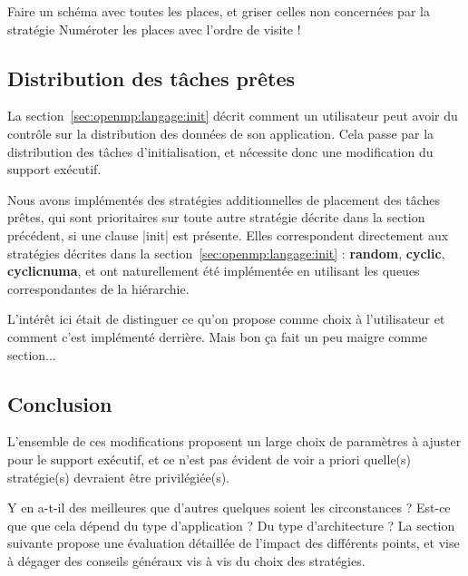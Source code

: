 \begin{todo}
  Faire un schéma avec toutes les places, et griser celles non concernées par la stratégie
  Numéroter les places avec l'ordre de visite !
\end{todo}


\subsection{Distribution des tâches prêtes}


La section~\ref{sec:openmp:langage:init} décrit comment un utilisateur peut avoir du contrôle sur la distribution des données de son application.
Cela passe par la distribution des tâches d'initialisation, et nécessite donc une modification du support exécutif.

Nous avons implémentés des stratégies additionnelles de placement des tâches prêtes, qui sont prioritaires sur toute autre stratégie décrite dans la section précédent, si une clause |init| est présente.
Elles correspondent directement aux stratégies décrites dans la section~\ref{sec:openmp:langage:init} : \textbf{random}, \textbf{cyclic}, \textbf{cyclicnuma}, et ont naturellement été implémentée en utilisant les queues correspondantes de la hiérarchie.

\begin{todo}
  L'intérêt ici était de distinguer ce qu'on propose comme choix à l'utilisateur et comment c'est implémenté derrière.
  Mais bon ça fait un peu maigre comme section...
\end{todo}


\subsection*{Conclusion}

L'ensemble de ces modifications proposent un large choix de paramètres à ajuster pour le support exécutif, et ce n'est pas évident de voir a priori quelle(s) stratégie(s) devraient être privilégiée(s).

Y en a-t-il des meilleures que d'autres quelques soient les circonstances ?
Est-ce que que cela dépend du type d'application ? Du type d'architecture ?
La section suivante propose une évaluation détaillée de l'impact des différents points, et vise à dégager des conseils généraux vis à vis du choix des stratégies.

